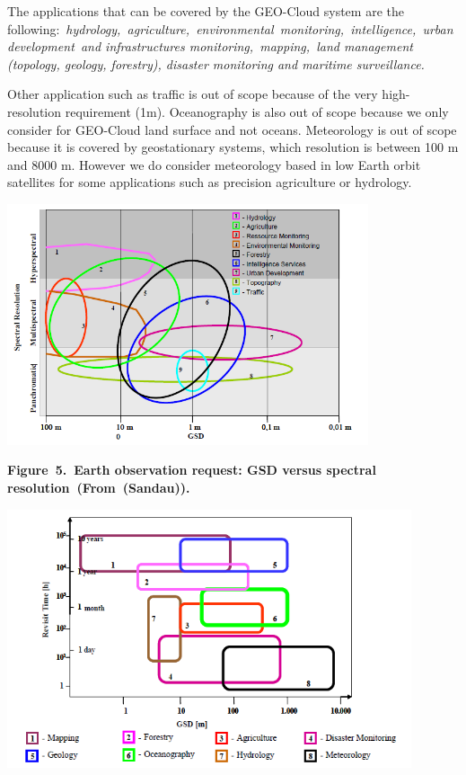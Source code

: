 \documentclass[a4paper]{article}
\begin{document}
\bigskip

The applications that can be covered by the GEO-Cloud system are the
following:\ \textit{h}\textit{ydrology,\ }\textit{a}\textit{griculture,\ }\textit{e}\textit{nvironmental\ }\textit{m}\textit{onitoring,\ }\textit{i}\textit{ntelligence,\ }\textit{u}\textit{rban\ }\textit{d}\textit{evelopment}\textit{\ and
infrastructures
monitoring}\textit{,\ }\textit{m}\textit{apping,\ }\textit{land
management (topology, geology, forestry), disaster monitoring and
maritime surveillance.}


\bigskip

Other application such as traffic is out of scope because of the very
high-resolution requirement (1m). Oceanography is also out of scope
because we only consider for GEO-Cloud land surface and not oceans.
Meteorology is out of scope because it is covered by geostationary
systems, which resolution is between 100 m and 8000 m. However we do
consider meteorology based in low Earth orbit satellites for some
applications such as precision agriculture or hydrology.


\bigskip

{\centering 
\includegraphics[width=4.18585in,height=2.79056in]{out-img9.png} \par}

{\centering\bfseries
\label{bkm:Ref377564516}Figure\ 5.\ Earth observation request: GSD
versus spectral resolution\ (From\ (Sandau)).
\par}


\bigskip

{\centering 
\includegraphics[width=4.69218in,height=2.9938in]{out-img10.png} \par}
\end{document}

